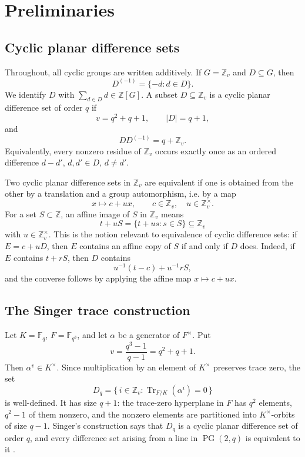 \documentclass[11pt,letterpaper]{amsart}
\theoremstyle{plain}
\newcommand{\F}{\mathbb F}
\newcommand{\Z}{\mathbb Z}
\newcommand{\Tr}{\operatorname{Tr}}
\begin{document}
\section{Preliminaries}

\subsection*{Cyclic planar difference sets}

Throughout, all cyclic groups are written additively.  If \(G=\Z_v\) and
\(D\subseteq G\), then
\[
 D^{(-1)}=\{-d:d\in D\}.
\]
We identify \(D\) with \(\sum_{d\in D}d\in \Z[G]\).  A subset
\(D\subseteq \Z_v\) is a cyclic planar difference set of order \(q\) if
\[
 v=q^2+q+1,\qquad |D|=q+1,
\]
and
\[
 DD^{(-1)}=q+\Z_v.
\]
Equivalently, every nonzero residue of \(\Z_v\) occurs exactly once as
an ordered difference \(d-d'\), \(d,d'\in D\), \(d\ne d'\).

Two cyclic planar difference sets in \(\Z_v\) are equivalent if one is
obtained from the other by a translation and a group automorphism, i.e.
by a map
\[
 x\longmapsto c+ux,\qquad c\in \Z_v,\quad u\in \Z_v^\times.
\]
For a set \(S\subset \Z\), an affine image of \(S\) in \(\Z_v\) means
\[
 t+uS=\{t+us:s\in S\}\subseteq \Z_v
\]
with \(u\in\Z_v^\times\).  This is the notion relevant to equivalence of
cyclic difference sets: if \(E=c+uD\), then \(E\) contains an affine copy
of \(S\) if and only if \(D\) does.  Indeed, if \(E\) contains
\(t+rS\), then \(D\) contains
\[
 u^{-1}(t-c)+u^{-1}rS,
\]
and the converse follows by applying the affine map \(x\mapsto c+ux\).

\subsection*{The Singer trace construction}

Let \(K=\F_q\), \(F=\F_{q^3}\), and let \(\alpha\) be a generator of
\(F^\times\).  Put
\[
 v=\frac{q^3-1}{q-1}=q^2+q+1.
\]
Then \(\alpha^v\in K^\times\).  Since multiplication by an element of
\(K^\times\) preserves trace zero, the set
\[
 D_q=\{\,i\in \Z_v:\Tr_{F/K}(\alpha^i)=0\,\}
\]
is well-defined.  It has size \(q+1\): the trace-zero hyperplane in
\(F\) has \(q^2\) elements, \(q^2-1\) of them nonzero, and the nonzero
elements are partitioned into \(K^\times\)-orbits of size \(q-1\).
Singer's construction says that \(D_q\) is a cyclic planar difference
set of order \(q\), and every difference set arising from a line in
\(\operatorname{PG}(2,q)\) is equivalent to it \cite{Singer}.
\end{document}
